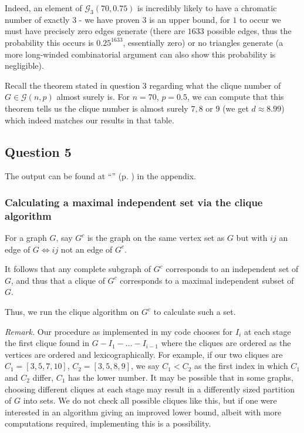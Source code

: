 \documentclass{article}
\newcommand{\namepageref}[1]{``\nameref{#1}'' (p. \pageref{#1})}
\begin{document}
Indeed, an element of $\mathcal{G}_3(70,0.75)$ is incredibly likely to have a chromatic number of exactly $3$ - we have proven $3$ is an upper bound, for $1$ to occur we must have precisely zero edges generate (there are $1633$ possible edges, thus the probability this occurs is $0.25^{1633}$, essentially zero) or no triangles generate (a more long-winded combinatorial argument can also show this probability is negligible).

Recall the theorem stated in question 3 regarding what the clique number of $G \in \mathcal{G}(n,p)$ almost surely is. For $n=70$, $p=0.5$, we can compute that this theorem tells us the clique number is almost surely $7, 8$ or $9$ (we get $d \approx 8.99$) which indeed matches our results in that table.

\subsection{Question 5}

The output can be found at \namepageref{output_question_5} in the appendix.

\subsubsection{Calculating a maximal independent set via the clique algorithm}

For a graph $G$, say $G^c$ is the graph on the same vertex set as $G$ but with $ij$ an edge of $G \iff ij$ not an edge of $G^c$.

It follows that any complete subgraph of $G^c$ corresponds to an independent set of $G$, and thus that a clique of $G^c$ corresponds to a maximal independent subset of $G$.

Thus, we run the clique algorithm on $G^c$ to calculate such a set.


\emph{Remark.} Our procedure as implemented in my code chooses for $I_i$ at each stage the first clique found in $G - I_1 - \dots - I_{i-1}$ where the cliques are ordered as the vertices are ordered and lexicographically. For example, if our two cliques are $C_1 = [3,5,7,10]$, $C_2 = [3,5,8,9]$, we say $C_1 < C_2$ as the first index in which $C_1$ and $C_2$ differ, $C_1$ has the lower number. It may be possible that in some graphs, choosing different cliques at each stage may result in a differently sized partition of $G$ into sets. We do not check all possible cliques like this, but if one were interested in an algorithm giving an improved lower bound, albeit with more computations required, implementing this is a possibility.
\end{document}

